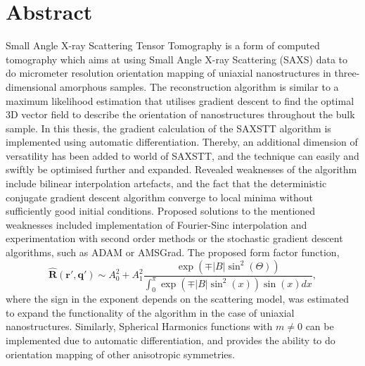 


\begingroup
\let\clearpage\relax
\let\cleardoublepage\relax
\let\cleardoublepage\relax

\chapter*{Abstract}

Small Angle X-ray Scattering Tensor Tomography is a form of computed tomography
which aims at using Small Angle X-ray Scattering (SAXS) data to do micrometer resolution orientation mapping
of uniaxial nanostructures in three-dimensional amorphous samples.
The reconstruction algorithm is similar to a maximum likelihood estimation that utilises gradient descent to find the optimal 3D vector field
to describe the orientation of nanostructures throughout the bulk sample.
In this thesis, the gradient calculation of the SAXSTT algorithm is implemented using automatic differentiation.
Thereby, an additional dimension of versatility has been added to world of SAXSTT, and the technique can easily and swiftly be optimised further and expanded.
Revealed weaknesses of the algorithm include bilinear interpolation artefacts,
and the fact that the deterministic conjugate gradient descent algorithm converge to local minima without sufficiently good initial conditions.
Proposed solutions to the mentioned weaknesses included implementation of Fourier-Sinc interpolation and experimentation with second order methods or the stochastic gradient descent algorithms, such as ADAM or AMSGrad.
The proposed form factor function,
\begin{equation*}
    \bm{\widehat{R}}(\bm{r'}, \bm{q'}) \sim A_{0}^{2} + A_{1}^{2}\frac{ \exp\left(\mp |B| \sin^2(\Theta) \right) } {\int_{0}^{\pi} \exp\left( \mp |B| \sin^{2}(x) \right) \sin(x) dx},
\end{equation*}
where the sign in the exponent depends on the scattering model, was estimated to expand the functionality of the algorithm in the case of uniaxial nanostructures.
Similarly, Spherical Harmonics functions with $m \neq 0$ can be implemented due to automatic differentiation,
and provides the ability to do orientation mapping of other anisotropic symmetries.

